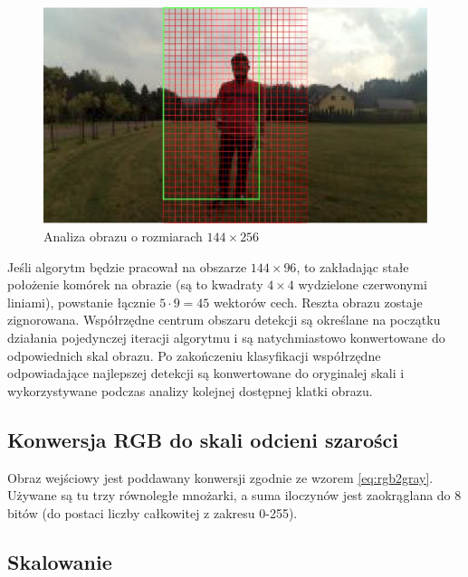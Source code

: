 \begin{figure}[h]
	\centering
	\includegraphics[width=15cm]{4_scaled_hog_example.jpg}
	\caption{Analiza obrazu o rozmiarach $144\times 256$}
	\label{fig:HOG_mesh}
\end{figure}

Jeśli algorytm będzie pracował na obszarze $144\times 96$, to zakładając stałe położenie komórek na obrazie (są to kwadraty $4\times4$ wydzielone czerwonymi liniami), powstanie łącznie $5\cdot9=45$ wektorów cech. 
Reszta obrazu zostaje zignorowana. 
Współrzędne centrum obszaru detekcji są określane na początku działania pojedynczej iteracji algorytmu i są natychmiastowo konwertowane do odpowiednich skal obrazu. Po zakończeniu klasyfikacji współrzędne odpowiadające najlepszej detekcji są konwertowane do oryginalej skali i wykorzystywane podczas analizy kolejnej dostępnej klatki obrazu.

\subsection{Konwersja RGB do skali odcieni szarości}

Obraz wejściowy jest poddawany konwersji zgodnie ze wzorem \eqref{eq:rgb2gray}. 
Używane są tu trzy równoległe mnożarki, a suma iloczynów jest zaokrąglana do 8 bitów (do postaci liczby całkowitej z zakresu 0-255).

\subsection{Skalowanie}

